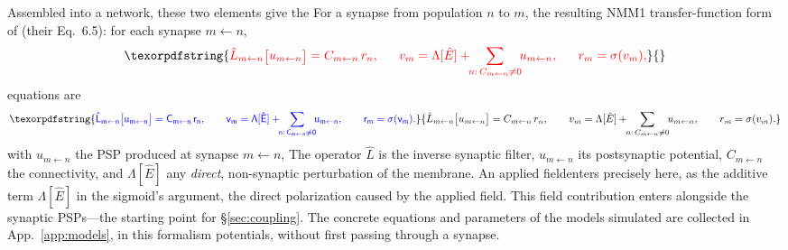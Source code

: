 \documentclass[11pt,a4paper]{article}
\newcommand{\Sig}{\sigma}
\providecommand{\DIFaddtex}[1]{{\protect\color{blue} \sf #1}} %
\providecommand{\DIFdeltex}[1]{{\protect\color{red} \scriptsize #1}} %
\providecommand{\DIFaddbegin}{} %
\providecommand{\DIFaddend}{} %
\providecommand{\DIFdelbegin}{} %
\providecommand{\DIFdelend}{} %
\providecommand{\DIFadd}[1]{\texorpdfstring{\DIFaddtex{#1}}{#1}} %
\providecommand{\DIFdel}[1]{\texorpdfstring{\DIFdeltex{#1}}{}} %
\begin{document}
\DIFdelbegin \DIFdel{Assembled into a network, these two elements give the }\DIFdelend \DIFaddbegin \DIFadd{For a synapse from population $n$ to $m$, the resulting }\DIFaddend NMM1 \DIFdelbegin \DIFdel{transfer-function form of
\cite{ruffini2025rosetta}
(their Eq.~6.5): for each synapse $m\!\leftarrow\!n$,
}\begin{displaymath}
\DIFdel{\hat L_{m\leftarrow n}\big[u_{m\leftarrow n}\big]=C_{m\leftarrow n}\,r_n,\qquad
v_m=\Lambda[\hat E]+\!\!\sum_{n:\,C_{m\leftarrow n}\neq0}\!\! u_{m\leftarrow n},\qquad
r_m=\Sig(v_m),
}\end{displaymath}%
\DIFdelend \DIFaddbegin \DIFadd{equations are
\cite{ruffini2025rosetta}
}\begin{equation}
\DIFadd{\hat L_{m\leftarrow n}\big[u_{m\leftarrow n}\big]=C_{m\leftarrow n}\,r_n,\qquad
v_m=\Lambda[\hat E]+\!\!\sum_{n:\,C_{m\leftarrow n}\neq0}\!\!u_{m\leftarrow n},\qquad
r_m=\Sig(v_m).
\label{eq:nmm1}
}\end{equation}\DIFaddend
\DIFdelbegin \DIFdel{with $u_{m\leftarrow n}$ the PSP produced at synapse $m\!\leftarrow\!n$, }\DIFdelend \DIFaddbegin \DIFadd{The operator $\hat L$ is the inverse synaptic filter, $u_{m\leftarrow n}$ its
postsynaptic potential, }\DIFaddend $C_{m\leftarrow n}$ the connectivity, and $\Lambda[\hat E]$
\DIFdelbegin \DIFdel{any \emph{direct}, non-synaptic perturbation of the membrane. An applied fieldenters precisely here, as the additive term $\Lambda[\hat E]$ in
the sigmoid's argument, }\DIFdelend \DIFaddbegin \DIFadd{the direct polarization caused by the applied field. This field contribution enters
}\DIFaddend alongside the synaptic \DIFdelbegin \DIFdel{PSPs---the starting point for
\S\ref{sec:coupling}. The concrete equations and parameters of the models simulated are
collected in App.~\ref{app:models}, in this formalism}\DIFdelend \DIFaddbegin \DIFadd{potentials, without first passing through a synapse}\DIFaddend .
\end{document}
